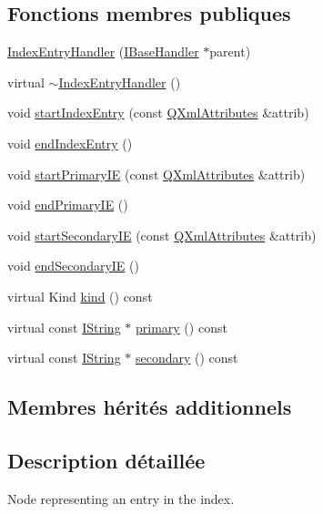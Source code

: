 \subsection*{Fonctions membres publiques}
\begin{DoxyCompactItemize}
\item 
\hyperlink{class_index_entry_handler_a7bd44d11b045262fcb3f519b7a2fa6f6}{Index\+Entry\+Handler} (\hyperlink{class_i_base_handler}{I\+Base\+Handler} $\ast$parent)
\item 
virtual \hyperlink{class_index_entry_handler_a1a4d4ba1af97993ef8427522df207843}{$\sim$\+Index\+Entry\+Handler} ()
\item 
void \hyperlink{class_index_entry_handler_a99c61049a71bca69ffb3b92420b8b81c}{start\+Index\+Entry} (const \hyperlink{class_q_xml_attributes}{Q\+Xml\+Attributes} \&attrib)
\item 
void \hyperlink{class_index_entry_handler_ad713f10bdcc0ebf1896fab2be18a1ebd}{end\+Index\+Entry} ()
\item 
void \hyperlink{class_index_entry_handler_a068d1e30b0687fa99917ace7bc41fbc2}{start\+Primary\+I\+E} (const \hyperlink{class_q_xml_attributes}{Q\+Xml\+Attributes} \&attrib)
\item 
void \hyperlink{class_index_entry_handler_ab48d2f416ebc4bc0d339cdcae8a8ce92}{end\+Primary\+I\+E} ()
\item 
void \hyperlink{class_index_entry_handler_ac5b3aed18322f73449b725e036612671}{start\+Secondary\+I\+E} (const \hyperlink{class_q_xml_attributes}{Q\+Xml\+Attributes} \&attrib)
\item 
void \hyperlink{class_index_entry_handler_ade626cede7cd69d868296d5db687542c}{end\+Secondary\+I\+E} ()
\item 
virtual Kind \hyperlink{class_index_entry_handler_a263d4e659ed57e9e5acdda9e4249236d}{kind} () const 
\item 
virtual const \hyperlink{class_i_string}{I\+String} $\ast$ \hyperlink{class_index_entry_handler_a6e89bb8047ddbdebaa792c91f11d4a21}{primary} () const 
\item 
virtual const \hyperlink{class_i_string}{I\+String} $\ast$ \hyperlink{class_index_entry_handler_a4ad1770a8460f11c29fd5d6445474630}{secondary} () const 
\end{DoxyCompactItemize}
\subsection*{Membres hérités additionnels}


\subsection{Description détaillée}
Node representing an entry in the index. 



